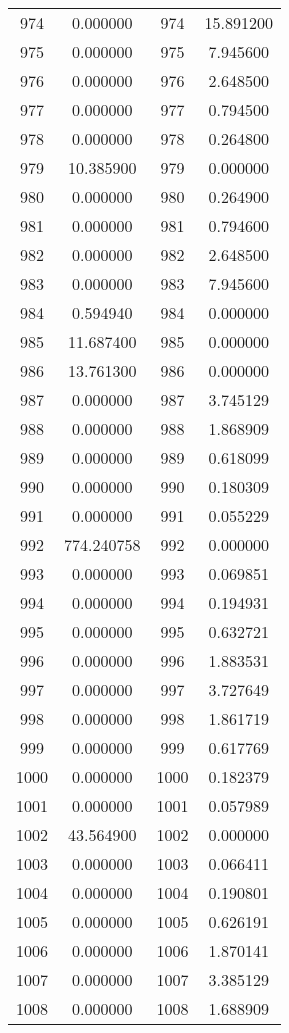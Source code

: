 \documentclass[12pt]{article}
\begin{document}
\begin{longtable}{@{}cccc@{}}
974 & 0.000000 & 974 & 15.891200 \\
975 & 0.000000 & 975 & 7.945600 \\
976 & 0.000000 & 976 & 2.648500 \\
977 & 0.000000 & 977 & 0.794500 \\
978 & 0.000000 & 978 & 0.264800 \\
979 & 10.385900 & 979 & 0.000000 \\
980 & 0.000000 & 980 & 0.264900 \\
981 & 0.000000 & 981 & 0.794600 \\
982 & 0.000000 & 982 & 2.648500 \\
983 & 0.000000 & 983 & 7.945600 \\
984 & 0.594940 & 984 & 0.000000 \\
985 & 11.687400 & 985 & 0.000000 \\
986 & 13.761300 & 986 & 0.000000 \\
987 & 0.000000 & 987 & 3.745129 \\
988 & 0.000000 & 988 & 1.868909 \\
989 & 0.000000 & 989 & 0.618099 \\
990 & 0.000000 & 990 & 0.180309 \\
991 & 0.000000 & 991 & 0.055229 \\
992 & 774.240758 & 992 & 0.000000 \\
993 & 0.000000 & 993 & 0.069851 \\
994 & 0.000000 & 994 & 0.194931 \\
995 & 0.000000 & 995 & 0.632721 \\
996 & 0.000000 & 996 & 1.883531 \\
997 & 0.000000 & 997 & 3.727649 \\
998 & 0.000000 & 998 & 1.861719 \\
999 & 0.000000 & 999 & 0.617769 \\
1000 & 0.000000 & 1000 & 0.182379 \\
1001 & 0.000000 & 1001 & 0.057989 \\
1002 & 43.564900 & 1002 & 0.000000 \\
1003 & 0.000000 & 1003 & 0.066411 \\
1004 & 0.000000 & 1004 & 0.190801 \\
1005 & 0.000000 & 1005 & 0.626191 \\
1006 & 0.000000 & 1006 & 1.870141 \\
1007 & 0.000000 & 1007 & 3.385129 \\
1008 & 0.000000 & 1008 & 1.688909 \\

\end{longtable}
\end{document}
